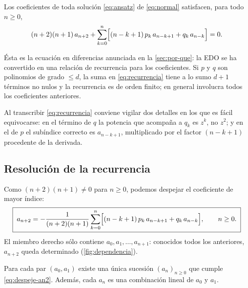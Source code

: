 \begin{resultado}\label{res:recurrencia}
Los coeficientes de toda solución \eqref{eq:ansatz} de \eqref{eq:normal}
satisfacen, para todo $n\ge0$,
\begin{equation}\label{eq:recurrencia}
  (n+2)(n+1)\,a_{n+2}
  +\sum_{k=0}^{n}\Bigl[(n-k+1)\,p_k\,a_{n-k+1}+q_k\,a_{n-k}\Bigr]=0 .
\end{equation}
\end{resultado}

Ésta es la ecuación en diferencias anunciada en la \cref{sec:por-que}: la
EDO se ha convertido en una relación de recurrencia para los coeficientes.
Si $p$ y $q$ son polinomios de grado $\le d$, la suma en \eqref{eq:recurrencia}
tiene a lo sumo $d+1$ términos no nulos y la recurrencia es de orden finito;
en general involucra todos los coeficientes anteriores.

\begin{observacion}\label{obs:erratas}
Al transcribir \eqref{eq:recurrencia} conviene vigilar dos detalles en los
que es fácil equivocarse: en el término de $q$ la potencia que acompaña a
$q_k$ es $z^{k}$, no $z^{2}$; y en el de $p$ el subíndice correcto es
$a_{n-k+1}$, multiplicado por el factor $(n-k+1)$ procedente de la derivada.
\end{observacion}

\subsection{Resolución de la recurrencia}\label{sec:resolucion}
Como $(n+2)(n+1)\neq0$ para $n\ge0$, podemos despejar el coeficiente de
mayor índice:
\begin{equation}\label{eq:despeje-an2}
  \boxed{\;a_{n+2}=-\frac{1}{(n+2)(n+1)}
  \sum_{k=0}^{n}\Bigl[(n-k+1)\,p_k\,a_{n-k+1}+q_k\,a_{n-k}\Bigr],
  \qquad n\ge0.\;}
\end{equation}
El miembro derecho sólo contiene $a_0,a_1,\dots,a_{n+1}$: conocidos todos los
anteriores, $a_{n+2}$ queda determinado (\cref{fig:dependencia}).

\begin{proposicion}\label{prop:induccion}
Para cada par $(a_0,a_1)$ existe una única sucesión $(a_n)_{n\ge0}$ que
cumple \eqref{eq:despeje-an2}. Además, cada $a_n$ es una combinación lineal
de $a_0$ y $a_1$.
\end{proposicion}

